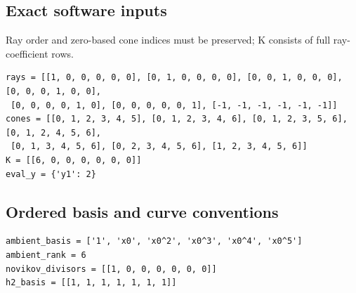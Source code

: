 \documentclass[10pt,a4paper]{article}
\begin{document}
\subsection*{Exact software inputs}
Ray order and zero-based cone indices must be preserved; K consists of full ray-coefficient rows.
\begin{lstlisting}
rays = [[1, 0, 0, 0, 0, 0], [0, 1, 0, 0, 0, 0], [0, 0, 1, 0, 0, 0], [0, 0, 0, 1, 0, 0],
 [0, 0, 0, 0, 1, 0], [0, 0, 0, 0, 0, 1], [-1, -1, -1, -1, -1, -1]]
cones = [[0, 1, 2, 3, 4, 5], [0, 1, 2, 3, 4, 6], [0, 1, 2, 3, 5, 6], [0, 1, 2, 4, 5, 6],
 [0, 1, 3, 4, 5, 6], [0, 2, 3, 4, 5, 6], [1, 2, 3, 4, 5, 6]]
K = [[6, 0, 0, 0, 0, 0, 0]]
eval_y = {'y1': 2}
\end{lstlisting}
\subsection*{Ordered basis and curve conventions}
\begin{lstlisting}
ambient_basis = ['1', 'x0', 'x0^2', 'x0^3', 'x0^4', 'x0^5']
ambient_rank = 6
novikov_divisors = [[1, 0, 0, 0, 0, 0, 0]]
h2_basis = [[1, 1, 1, 1, 1, 1, 1]]
\end{lstlisting}
\end{document}
